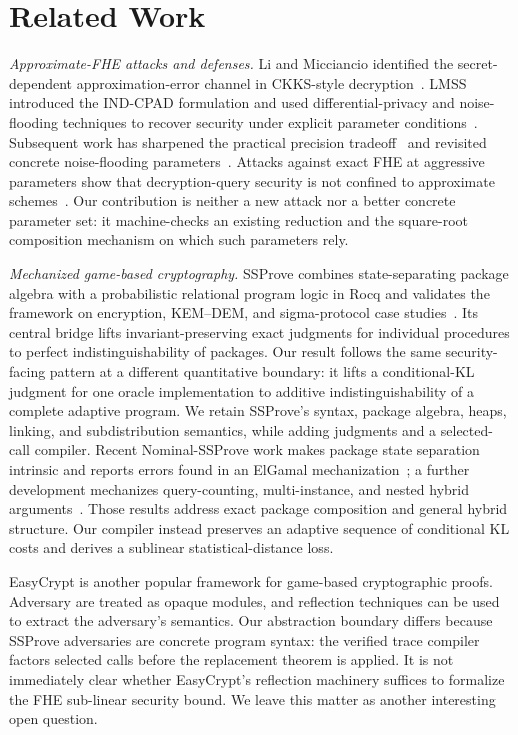 \section{Related Work}
\label{sec:related-work}

\emph{Approximate-FHE attacks and defenses.} Li and Micciancio identified the secret-dependent approximation-error channel in CKKS-style decryption~\cite{lm}.
LMSS introduced the IND-CPAD formulation and used differential-privacy and noise-flooding techniques to recover security under explicit parameter conditions~\cite{lmss}.
Subsequent work has sharpened the practical precision tradeoff~\cite{costache2023precision} and revisited concrete noise-flooding parameters~\cite{bergamaschi2025revisiting}.
Attacks against exact FHE at aggressive parameters show that decryption-query security is not confined to approximate schemes~\cite{cheon2024attacks}.
Our contribution is neither a new attack nor a better concrete parameter set: it machine-checks an existing reduction and the square-root composition mechanism on which such parameters rely.

\emph{Mechanized game-based cryptography.} SSProve combines state-separating package algebra with a probabilistic relational program logic in Rocq and validates the framework on encryption, KEM--DEM, and sigma-protocol case studies~\cite{ssprove}.
Its central bridge lifts invariant-preserving exact judgments for individual procedures to perfect indistinguishability of packages.
Our result follows the same security-facing pattern at a different quantitative boundary: it lifts a conditional-KL judgment for one oracle implementation to additive indistinguishability of a complete adaptive program.
We retain SSProve's syntax, package algebra, heaps, linking, and subdistribution semantics, while adding judgments and a selected-call compiler.
Recent Nominal-SSProve work makes package state separation intrinsic and reports errors found in an ElGamal mechanization~\cite{nominal-ssprove}; a further development mechanizes query-counting, multi-instance, and nested hybrid arguments~\cite{nested-hybrids}.
Those results address exact package composition and general hybrid structure.
Our compiler instead preserves an adaptive sequence of conditional KL costs and derives a sublinear statistical-distance loss.

EasyCrypt is another popular framework for game-based cryptographic proofs.
Adversary are treated as opaque modules, and reflection techniques \cite{reflection} can be used to extract the adversary's semantics.
Our abstraction boundary differs because SSProve adversaries are concrete program syntax: the verified trace compiler factors selected calls before the replacement theorem is applied.
It is not immediately clear whether EasyCrypt's reflection machinery suffices to formalize the FHE sub-linear security bound.
We leave this matter as another interesting open question.

